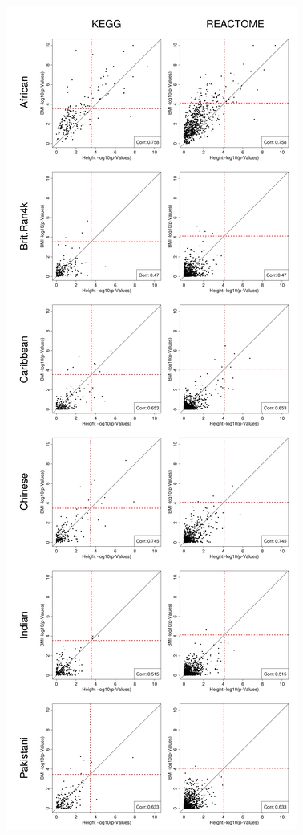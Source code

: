 \documentclass[10pt]{article}
\begin{document}
\begin{landscape}
\setlength{\footskip}{3cm}
\begin{figure}[htbp]
\centering
\hspace*{-2cm}
\includegraphics[angle=270,scale=.25]{Images/Supp/InterPath_Supp_Figure_MAPITR_PhenoComps_AllPops_vs4.png}

\end{figure}
\end{landscape}
\end{document}
